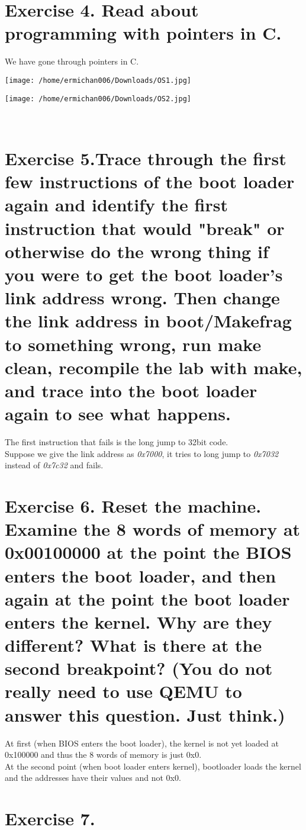 \documentclass[a4paper]{article}
\begin{document}
		\section{Exercise 4. Read about programming with pointers in C.}
		\textbullet \quad We have gone through pointers in C. \\
		\begin{minipage}{0.4\textwidth}
			\texttt{[image: /home/ermichan006/Downloads/OS1.jpg]}		
		\end{minipage}
		\raggedright
		\noindent
		\begin{minipage}{0.4\textwidth}
					\texttt{[image: /home/ermichan006/Downloads/OS2.jpg]}
		\end{minipage}\\
		\section{Exercise 5.Trace through the first few instructions of the boot loader again and identify the first instruction that would "break" or otherwise do the wrong thing if you were to get the boot loader's link address wrong. Then change the link address in boot/Makefrag to something wrong, run make clean, recompile the lab with make, and trace into the boot loader again to see what happens.}
		\textbullet \quad The first instruction that fails is the long jump to 32bit code. \\
		\textbullet \quad Suppose we give the link address as \emph{0x7000}, it tries to long jump to \emph{0x7032} instead of \emph{0x7c32} and fails.
		\section{Exercise 6. Reset the machine. Examine the 8 words of memory at 0x00100000 at the point the BIOS enters the boot loader, and then again at the point the boot loader enters the kernel. Why are they different? What is there at the second breakpoint? (You do not really need to use QEMU to answer this question. Just think.) }
		\textbullet \quad At first (when BIOS enters the boot loader), the kernel is not yet loaded at 0x100000 and thus the 8 words of memory is just 0x0. \\
		\textbullet \quad At the second point (when boot loader enters kernel), bootloader loads the kernel and the addresses have their values and not 0x0.
		\section{Exercise 7.}
\end{document}
